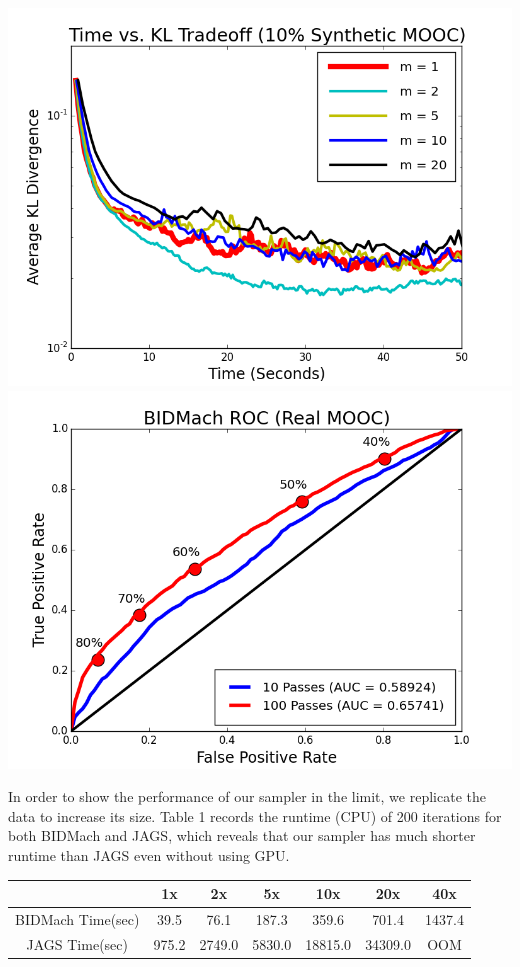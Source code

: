 \documentclass[a0paper,portrait]{baposter}
\begin{document}
\begin{poster}
{\begin{center}
\includegraphics[width=0.45\linewidth]{fig_kltime_tradeoff_mooc.png}
\includegraphics[width=0.45\linewidth]{fig_bidmach_real_mooc_roc_curve_v2.png}
\end{center}




In order to show the performance of our sampler in the limit, we replicate the data to increase its size. Table 1 records the runtime (CPU) of 200 iterations for both BIDMach and JAGS, which reveals that our sampler has much shorter runtime than JAGS even without using GPU. 

\begin{center}
\begin{tabular}{ |c|c|c|c|c|c|c| } 
\hline
                  & 1x    & 2x    & 5x    & 10x   & 20x   & 40x   \\
\hline \hline
BIDMach Time(sec) & 39.5 & 76.1 & 187.3 & 359.6 & 701.4 & 1437.4 \\ 
JAGS Time(sec)    & 975.2 & 2749.0 & 5830.0 & 18815.0 & 34309.0 & OOM \\
\hline
\end{tabular}
\end{center}

}
\end{poster}
\end{document}
